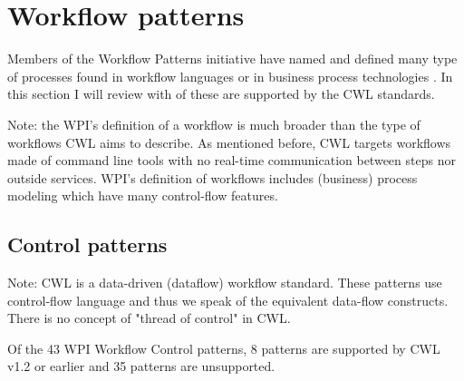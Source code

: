 \section{Workflow patterns}

Members of the Workflow Patterns initiative have named and defined many type of processes found in workflow languages or in business process technologies
\cite{van_der_aalst_workflow_2003,russell_workflow_resource_2004,russell_exception_2006,russell_workflow_data_2004,suriadi_event_2017}. In this section I will review with of these are supported by the CWL standards.

Note: the WPI's definition of a workflow is much broader than the type of workflows CWL aims to describe. As mentioned before, CWL targets workflows made of command line tools with no real-time communication between steps nor outside services. WPI's definition of workflows includes (business) process modeling which have many control-flow features.

\subsection{Control patterns}

Note: CWL is a data-driven (dataflow) workflow standard. These patterns use control-flow language and thus we speak of the equivalent data-flow constructs. There is no concept of "thread of control" in CWL.

Of the 43 WPI Workflow Control patterns, 8 patterns are supported by CWL v1.2 or earlier and 35 patterns are unsupported.

